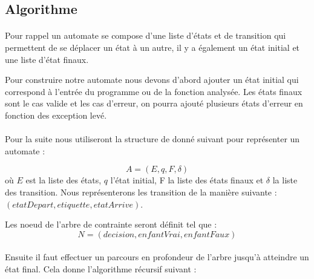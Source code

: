\subsection{Algorithme}

\paragraph{}
Pour rappel un automate se compose d'une liste d'états et de transition qui 
permettent de se déplacer un état à un autre, il y a également un état initial 
et une liste d'état finaux.


Pour construire notre automate nous devons d'abord ajouter un état initial qui 
correspond à l'entrée du programme ou de la fonction analysée. Les états finaux 
sont le cas valide et les cas d'erreur, on pourra ajouté plusieurs états 
d'erreur en fonction des exception levé.

\paragraph{}
Pour la suite nous utiliseront la structure de donné suivant pour représenter 
un automate :

$$A = ( E, q, F, \delta )$$
où $E$ est la liste des états, $q$ l'état initial, F la liste des états finaux 
et $\delta$ la liste des transition. Nous représenterons les transition de la 
manière suivante : $(etatDepart, etiquette, etatArrive)$.


Les noeud de l'arbre de contrainte seront définit tel que :
$$ N = (decision, enfantVrai, enfantFaux)$$


\paragraph{}
Ensuite il faut effectuer un parcours en profondeur de l'arbre jusqu'à 
atteindre un état final.
Cela donne l'algorithme récursif suivant :

